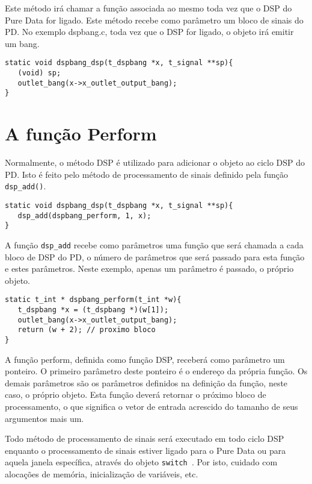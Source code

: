 Este método irá chamar a função associada ao mesmo toda vez que o DSP do Pure
Data for ligado.
Este método recebe como parâmetro um bloco de sinais do PD.
No exemplo dspbang.c, toda vez que o DSP for ligado, o objeto irá emitir um bang.

\begin{lstlisting}[caption=O método DSP]
static void dspbang_dsp(t_dspbang *x, t_signal **sp){
   (void) sp;
   outlet_bang(x->x_outlet_output_bang);
}
\end{lstlisting}

\section{A função Perform}

Normalmente, o método DSP é utilizado para adicionar o objeto ao ciclo DSP do PD.
Isto é feito pelo método de processamento de sinais definido pela função \texttt{dsp\_add()}.

\begin{lstlisting}[caption=O método DSP add]
static void dspbang_dsp(t_dspbang *x, t_signal **sp){
   dsp_add(dspbang_perform, 1, x);
}
\end{lstlisting}

A função \texttt{dsp\_add} recebe como parâmetros uma função que será chamada a
cada bloco de DSP do PD, o número de parâmetros que será passado para esta função
e estes parâmetros.
Neste exemplo, apenas um parâmetro é passado, o próprio objeto.

\begin{lstlisting}[caption=A função perform]
static t_int * dspbang_perform(t_int *w){
   t_dspbang *x = (t_dspbang *)(w[1]);
   outlet_bang(x->x_outlet_output_bang);
   return (w + 2); // proximo bloco
}
\end{lstlisting}

A função perform, definida como função DSP, receberá como parâmetro um ponteiro.
O primeiro parâmetro deste ponteiro é o endereço da própria função.
Os demais parâmetros são os parâmetros definidos na definição da função, neste
caso, o próprio objeto.
Esta função deverá retornar o próximo bloco de processamento, o que significa
o vetor de entrada acrescido do tamanho de seus argumentos mais um.

Todo método de processamento de sinais será executado em todo ciclo DSP enquanto
o processamento de sinais estiver ligado para o Pure Data ou para aquela janela
específica, através do objeto \texttt{switch~}.
Por isto, cuidado com alocações de memória, inicialização de variáveis, etc.

